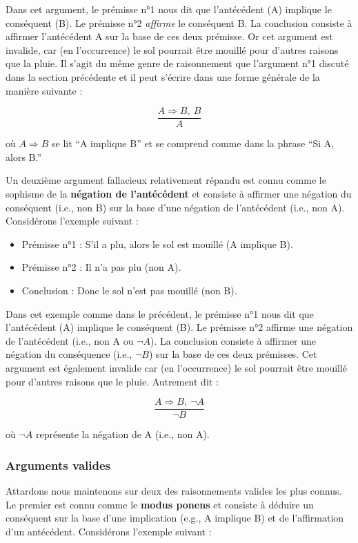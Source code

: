 \documentclass[
  a4paper,11pt,twoside,onecolumn,openright,final,oldfontcommands]{memoir}
\providecommand{\tightlist}{%
  \setlength{\itemsep}{0pt}\setlength{\parskip}{0pt}}
\theoremstyle{definition}
\theoremstyle{definition}
\theoremstyle{definition}
\theoremstyle{remark}
\begin{document}
Dans cet argument, le prémisse n°1 nous dit que l'antécédent (A) implique le conséquent (B). Le prémisse n°2 \emph{affirme} le conséquent B. La conclusion consiste à affirmer l'antécédent A sur la base de ces deux prémisse. Or cet argument est invalide, car (en l'occurrence) le sol pourrait être mouillé pour d'autres raisons que la pluie. Il s'agit du même genre de raisonnement que l'argument n°1 discuté dans la section précédente et il peut s'écrire dans une forme générale de la manière suivante :

\[\dfrac{A \Rightarrow B, \ B}{A}\]

où \(A \Rightarrow B\) se lit ``A implique B'' et se comprend comme dans la phrase ``Si A, alors B.''

Un deuxième argument fallacieux relativement répandu est connu comme le sophisme de la \textbf{négation de l'antécédent} et consiste à affirmer une négation du conséquent (i.e., non B) sur la base d'une négation de l'antécédent (i.e., non A). Considérons l'exemple suivant :

\begin{itemize}
\tightlist
\item
  Prémisse n°1 : S'il a plu, alors le sol est mouillé (A implique B).
\item
  Prémisse n°2 : Il n'a pas plu (non A).
\item
  Conclusion : Donc le sol n'est pas mouillé (non B).
\end{itemize}

Dans cet exemple comme dans le précédent, le prémisse n°1 nous dit que l'antécédent (A) implique le conséquent (B). Le prémisse n°2 affirme une négation de l'antécédent (i.e., non A ou \(\neg A\)). La conclusion consiste à affirmer une négation du conséquence (i.e., \(\neg B\)) sur la base de ces deux prémisses. Cet argument est également invalide car (en l'occurrence) le sol pourrait être mouillé pour d'autres raisons que le pluie. Autrement dit :

\[\dfrac{A \Rightarrow B, \ \neg A}{\neg B}\]

où \(\neg A\) représente la négation de A (i.e., non A).

\hypertarget{arguments-valides}{%
\subsubsection{Arguments valides}\label{arguments-valides}}

Attardons nous maintenons sur deux des raisonnements valides les plus connus. Le premier est connu comme le \textbf{modus ponens} et consiste à déduire un conséquent sur la base d'une implication (e.g., A implique B) et de l'affirmation d'un antécédent. Considérons l'exemple suivant :
\end{document}
